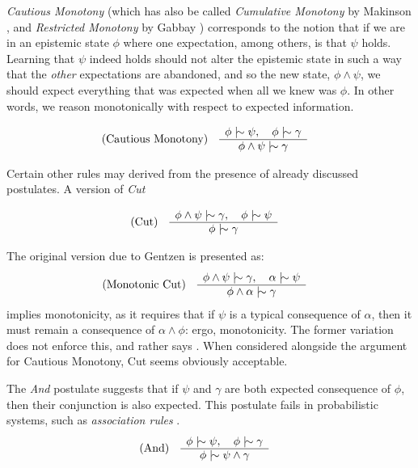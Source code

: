 \textit{Cautious Monotony} (which has also be called \textit{Cumulative Monotony} by Makinson \cite{makinson2003bridges},
and \textit{Restricted Monotony} by Gabbay \cite{gabbay1985theoreticalFoundations}) corresponds to the notion that if we
are in an epistemic state $\phi$ where one expectation, among others, is that $\psi$ holds. Learning that $\psi$ indeed holds
should not alter the epistemic state in such a way that the \textit{other} expectations are abandoned, and so the new state,
$\phi \land \psi$, we should expect everything that was expected when all we knew was $\phi$. In other words, we reason monotonically
with respect to expected information.

\begin{align}
	\label{postulate:cm}\inferLeft{Cautious Monotony}{\phi \twiddle \psi, \quad \phi \twiddle \gamma }{\phi \land \psi \twiddle \gamma}
\end{align}

Certain other rules may derived from the presence of already discussed postulates. A version of \textit{Cut}

\begin{align}
	\label{postulate:cut}\inferLeft{Cut}{\phi \land \psi \twiddle \gamma, \quad \phi \twiddle \psi}{\phi \twiddle \gamma}
\end{align}

The original version due to Gentzen \cite{Ben1993Mathematical} is presented as:
\begin{align}
	\inferLeft{Monotonic Cut}{\phi \land \psi \twiddle \gamma, \quad \alpha \twiddle \psi}{\phi \land \alpha \twiddle \gamma}
\end{align}
implies monotonicity, as it requires that if $\psi$ is a typical consequence of $\alpha$, then it must remain a consequence
of $\alpha \land \phi$: ergo, monotonicity. The former variation does not enforce this, and rather says .
When considered alongside the argument for Cautious Monotony, Cut seems obviously acceptable.

The \textit{And} postulate suggests that if $\psi$ and $\gamma$ are both expected consequence of $\phi$, then their
conjunction is also expected. This postulate fails in probabilistic systems, such as \textit{association rules} \cite{gabbay1985theoreticalFoundations}.
\begin{align}
	\label{postulate:and}\inferLeft{And}{\phi \twiddle \psi, \quad \phi \twiddle \gamma}{\phi \twiddle \psi \land \gamma}
\end{align}

